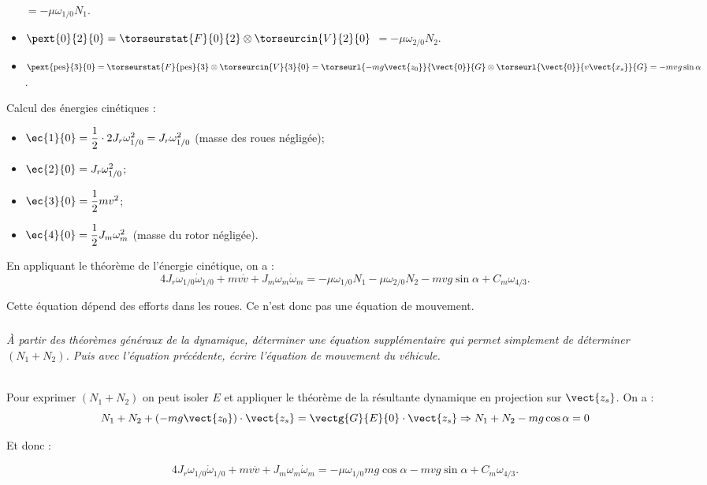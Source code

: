 \begin{multicols}{2}
\begin{corrige}
\begin{itemize}
$= -\mu\omega_{1/0} N_1$.

\item $ \pext{0}{2}{0} = \torseurstat{F}{0}{2} \otimes \torseurcin{V}{2}{0}$ $= -\mu\omega_{2/0} N_2$.

\item $ \pext{\text{pes}}{3}{0} = \torseurstat{F}{\text{pes}}{3} \otimes \torseurcin{V}{3}{0} =\torseurl{-mg\vect{z_0}}{\vect{0}}{G} \otimes  \torseurl{\vect{0}}{v\vect{x_s}}{G} =-mvg\sin\alpha$.

\end{itemize}


Calcul des énergies cinétiques : 
\begin{itemize}
\item $\ec{1}{0} = \dfrac{1}{2} \cdot 2 J_r \omega_{1/0}^2  = J_r \omega_{1/0}^2$ (masse des roues négligée);
\item $\ec{2}{0} = J_r \omega_{1/0}^2$;
\item $\ec{3}{0} = \dfrac{1}{2}mv^2$;
\item $\ec{4}{0} = \dfrac{1}{2} J_m \omega_m^2$ (masse du rotor négligée).
\end{itemize}


En appliquant le théorème de l'énergie cinétique, on a :
$$
4 J_r \omega_{1/0} \dot{\omega}_{1/0} + m v \dot{v} + J_m \omega_m \dot{\omega}_m =  -\mu\omega_{1/0} N_1-\mu\omega_{2/0} N_2 -mvg\sin\alpha +C_m \omega_{4/3}. $$

Cette équation dépend des efforts dans les roues. Ce n'est donc pas une équation de mouvement.


\end{corrige}

\else
\fi


\subparagraph{}\textit{À partir des théorèmes généraux de la dynamique, déterminer une équation supplémentaire qui permet simplement de déterminer $(N_1 + N_2)$. Puis avec l’équation précédente, écrire l’équation de mouvement du véhicule.}
\ifprof
\begin{corrige}~\\
Pour exprimer $(N_1 + N_2)$ on peut isoler $E$ et appliquer le théorème de la résultante dynamique en projection sur $\vect{z_s}$. On a : 
$$
N_1 + N_2 + \left(-mg\vect{z_0}\right)\cdot \vect{z_s} = \vectg{G}{E}{0} \cdot \vect{z_s} \Rightarrow 
N_1 + N_2 -mg\cos \alpha = 0
$$

Et donc : 

$$4 J_r \omega_{1/0} \dot{\omega}_{1/0} + m v \dot{v} + J_m \omega_m \dot{\omega}_m =  -\mu\omega_{1/0} mg\cos \alpha -mvg\sin\alpha +C_m \omega_{4/3}. $$


\end{corrige}
\end{multicols}
